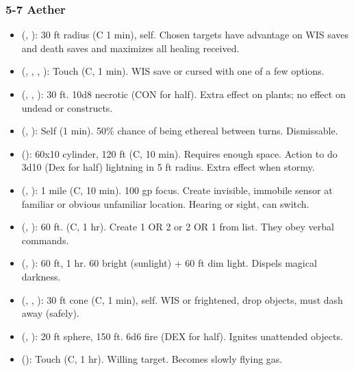 \subsubsection{5-7 Aether}
\begin{itemize}
	\item {} (, ): 30 ft radius (C 1 min), self. Chosen targets have advantage on WIS saves and death saves and maximizes all healing received.
	\item {} (, , , ): Touch (C, 1 min). WIS save or cursed with one of a few options.
	\item {} (, , ): 30 ft. 10d8 necrotic (CON for half). Extra effect on plants; no effect on undead or constructs.
	\item {} (, ): Self (1 min). 50\% chance of being ethereal between turns. Dismissable.
	\item {} (): 60x10 cylinder, 120 ft (C, 10 min). Requires enough space. Action to do 3d10 (Dex for half) lightning in 5 ft radius. Extra effect when stormy.
	\item {} (, ): 1 mile (C, 10 min). 100 gp focus. Create invisible, immobile sensor at familiar or obvious unfamiliar location. Hearing or sight, can switch.
	\item {} (, ): 60 ft. (C, 1 hr). Create 1 OR 2 or 2 OR 1 from list. They obey verbal commands.
	\item {} (, ): 60 ft, 1 hr. 60 bright (sunlight) + 60 ft dim light. Dispels magical darkness.
	\item {} (, , ): 30 ft cone (C, 1 min), self. WIS or frightened, drop objects, must dash away (safely).
	\item {} (, ): 20 ft sphere, 150 ft. 6d6 fire (DEX for half). Ignites unattended objects.
	\item {} (): Touch (C, 1 hr). Willing target. Becomes slowly flying gas.

\end{itemize}
